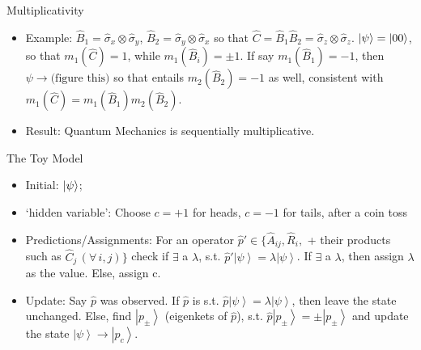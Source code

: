 \documentclass[final,hyperref={pdfpagelabels=false}]{beamer}
\begin{document}
\begin{frame}[t]
\begin{columns}[c]
\begin{column}{.32\textwidth}
\begin{block}{Multiplicativity}
\begin{itemize}
      \item Example: $\hat B_1 = \hat {\sigma} _x \otimes \hat {\sigma}_y$, $\hat B_2 = \hat {\sigma} _y \otimes \hat {\sigma}_x$ so that $\hat C = \hat B_1 \hat B_2 = \hat \sigma _z \otimes \hat \sigma _z$. $\ket {\psi}=\ket{00}$, so that $m_1(\hat C)=1$, while $m_1(\hat B_i)=\pm 1$. If say $m_1(\hat B_1)=-1$, then ${\psi} \to \text{(figure this)}$ so that entails $m_2(\hat B_2)=-1$ as well, consistent with $m_1(\hat C)=m_1(\hat B_1)m_2(\hat B_2)$.

      \item Result: Quantum Mechanics is sequentially multiplicative.

    \end{itemize}
     
  \end{block}

  \begin{block}{The Toy Model}
    \begin{itemize}
      \item Initial: $\ket {\psi}$; 
      \item `hidden variable': Choose $c=+1$ for heads, $c=-1$ for tails, after a coin toss
      \item Predictions/Assignments: For an operator $\hat{p}'\in\{\hat{A}_{ij},\hat{R}_{i},$ + their products such as $\hat{C}_{j}\,(\forall\,i,j)\}$  check if $\exists$ a $\lambda$, s.t. $\hat{p}'\left|\psi\right\rangle =\lambda\left|\psi\right\rangle$. If $\exists$ a $\lambda$, then assign $\lambda$ as the value. Else, assign c.
      \item Update: Say $\hat{p}$ was observed. If $\hat{p}$ is s.t. $\hat{p}\left|\psi\right\rangle =\lambda\left|\psi\right\rangle$, then leave the state unchanged. Else, find $\left|p_{\pm}\right\rangle$   (eigenkets of $\hat{p}$), s.t. $\hat{p}\left|p_{\pm}\right\rangle =\pm\left|p_{\pm}\right\rangle$ and update the state $\left|\psi\right\rangle \to\left|p_{c}\right\rangle$. 
    \end{itemize}


\end{block}
\end{column}
\end{columns}
\end{frame}
\end{document}
